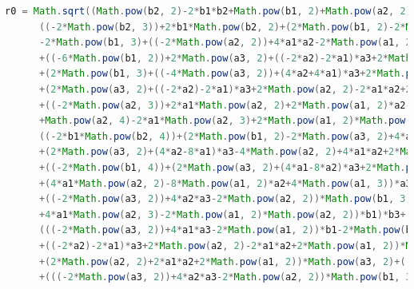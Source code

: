 \documentclass{article}
\begin{document}
{\begin{lstlisting}[language = Java,breaklines = true]
    r0 = Math.sqrt((Math.pow(b2, 2)-2*b1*b2+Math.pow(b1, 2)+Math.pow(a2, 2)-2*a1*a2+Math.pow(a1, 2))*Math.pow(b3, 4)+
      ((-2*Math.pow(b2, 3))+2*b1*Math.pow(b2, 2)+(2*Math.pow(b1, 2)-2*Math.pow(a2, 2)+4*a1*a2-2*Math.pow(a1, 2))*b2
      -2*Math.pow(b1, 3)+((-2*Math.pow(a2, 2))+4*a1*a2-2*Math.pow(a1, 2))*b1)*Math.pow(b3, 3)+(Math.pow(b2, 4)+2*b1*Math.pow(b2, 3)
      +((-6*Math.pow(b1, 2))+2*Math.pow(a3, 2)+((-2*a2)-2*a1)*a3+2*Math.pow(a2, 2)-2*a1*a2+2*Math.pow(a1, 2))*Math.pow(b2, 2)
      +(2*Math.pow(b1, 3)+((-4*Math.pow(a3, 2))+(4*a2+4*a1)*a3+2*Math.pow(a2, 2)-8*a1*a2+2*Math.pow(a1, 2))*b1)*b2+Math.pow(b1, 4)
      +(2*Math.pow(a3, 2)+((-2*a2)-2*a1)*a3+2*Math.pow(a2, 2)-2*a1*a2+2*Math.pow(a1, 2))*Math.pow(b1, 2)+(2*Math.pow(a2, 2)-4*a1*a2+2*Math.pow(a1, 2))*Math.pow(a3, 2)
      +((-2*Math.pow(a2, 3))+2*a1*Math.pow(a2, 2)+2*Math.pow(a1, 2)*a2-2*Math.pow(a1, 3))*a3
      +Math.pow(a2, 4)-2*a1*Math.pow(a2, 3)+2*Math.pow(a1, 2)*Math.pow(a2, 2)-2*Math.pow(a1, 3)*a2+Math.pow(a1, 4))*Math.pow(b3, 2)+
      ((-2*b1*Math.pow(b2, 4))+(2*Math.pow(b1, 2)-2*Math.pow(a3, 2)+4*a1*a3-2*Math.pow(a1, 2))*Math.pow(b2, 3)+(2*Math.pow(b1, 3)
      +(2*Math.pow(a3, 2)+(4*a2-8*a1)*a3-4*Math.pow(a2, 2)+4*a1*a2+2*Math.pow(a1, 2))*b1)*Math.pow(b2, 2)
      +((-2*Math.pow(b1, 4))+(2*Math.pow(a3, 2)+(4*a1-8*a2)*a3+2*Math.pow(a2, 2)+4*a1*a2-4*Math.pow(a1, 2))*Math.pow(b1, 2)+((-2*Math.pow(a2, 2))+4*a1*a2-2*Math.pow(a1, 2))*Math.pow(a3, 2)
      +(4*a1*Math.pow(a2, 2)-8*Math.pow(a1, 2)*a2+4*Math.pow(a1, 3))*a3-2*Math.pow(a1, 2)*Math.pow(a2, 2)+4*Math.pow(a1, 3)*a2-2*Math.pow(a1, 4))*b2
      +((-2*Math.pow(a3, 2))+4*a2*a3-2*Math.pow(a2, 2))*Math.pow(b1, 3)+(((-2*Math.pow(a2, 2))+4*a1*a2-2*Math.pow(a1, 2))*Math.pow(a3, 2)+(4*Math.pow(a2, 3)-8*a1*Math.pow(a2, 2)+4*Math.pow(a1, 2)*a2)*a3-2*Math.pow(a2, 4)
      +4*a1*Math.pow(a2, 3)-2*Math.pow(a1, 2)*Math.pow(a2, 2))*b1)*b3+(Math.pow(b1, 2)+Math.pow(a3, 2)-2*a1*a3+Math.pow(a1, 2))*Math.pow(b2, 4)+
      (((-2*Math.pow(a3, 2))+4*a1*a3-2*Math.pow(a1, 2))*b1-2*Math.pow(b1, 3))*Math.pow(b2, 3)+(Math.pow(b1, 4)+(2*Math.pow(a3, 2)
      +((-2*a2)-2*a1)*a3+2*Math.pow(a2, 2)-2*a1*a2+2*Math.pow(a1, 2))*Math.pow(b1, 2)+Math.pow(a3, 4)+((-2*a2)-2*a1)*Math.pow(a3, 3)
      +(2*Math.pow(a2, 2)+2*a1*a2+2*Math.pow(a1, 2))*Math.pow(a3, 2)+((-4*a1*Math.pow(a2, 2))+2*Math.pow(a1, 2)*a2-2*Math.pow(a1, 3))*a3+2*Math.pow(a1, 2)*Math.pow(a2, 2)-2*Math.pow(a1, 3)*a2+Math.pow(a1, 4))*Math.pow(b2, 2)
      +(((-2*Math.pow(a3, 2))+4*a2*a3-2*Math.pow(a2, 2))*Math.pow(b1, 3)+((-2*Math.pow(a3, 4))+(4*a2+4*a1)*Math.pow(a3, 3)+((-2*Math.pow(a2, 2))-8*a1*a2-2*Math.pow(a1, 2))*Math.pow(a3, 2)

\end{lstlisting}}
\end{document}
